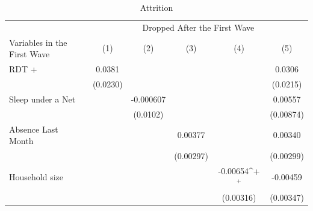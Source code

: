 \documentclass[fleqn,11pt]{article}
\newcommand{\sym}[1]{\rlap{$#1$}}
\def\sym#1{\ifmmode^{#1}\else\(^{#1}\)\fi
}
\begin{document}
\begin{table}[h]
\caption{Attrition}
\label{drop_2nd3rd_child}\centering
\begin{adjustbox}{max width=\textwidth}
\begin{threeparttable}
\begin{tabular}{l*{5}{c}}
\hline\hline

                    &\multicolumn{5}{c}{Dropped After the First Wave}\\ \cmidrule(lr){2-6} 
                                     Variables in the First Wave &\multicolumn{1}{c}{(1)}&\multicolumn{1}{c}{(2)}&\multicolumn{1}{c}{(3)}&\multicolumn{1}{c}{(4)}&\multicolumn{1}{c}{(5)}\\
\hline
RDT +               &      0.0381         &                     &                     &                     &      0.0306         \\
                    &    (0.0230)         &                     &                     &                     &    (0.0215)         \\

Sleep under a Net      &                     &   -0.000607         &                     &                     &     0.00557         \\
                    &                     &    (0.0102)         &                     &                     &   (0.00874)         \\

Absence Last Month  &                     &                     &     0.00377         &                     &     0.00340         \\
                    &                     &                     &   (0.00297)         &                     &   (0.00299)         \\

Household size             &                     &                     &                     &    -0.00654\sym{+}  &    -0.00459         \\
                    &                     &                     &                     &   (0.00316)         &   (0.00347)         \\


\end{tabular}
\end{threeparttable}
\end{adjustbox}
\end{table}
\end{document}
